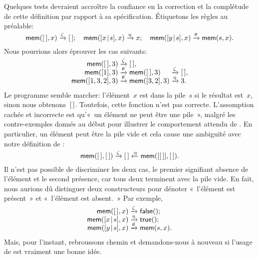 Quelques tests devraient accroître la confiance en la
correction et la complétude de
cette définition par rapport à sa spécification. Étiquetons les règles
au préalable:
\begin{equation*}
\textsf{mem}([\,],x)         \xrightarrow{\smash{\zeta}} [\,];\quad
\textsf{mem}([{x}\!\mid\!{s}],x) \xrightarrow{\smash{\eta}}   x;\quad
\textsf{mem}([{y}\!\mid\!{s}],x) \xrightarrow{\smash{\theta}} \textsf{mem}(s,x).
\end{equation*}
Nous pourrions alors éprouver les cas suivants:
\begin{equation*}
\begin{array}{r@{\;}l@{\;}l@{\;}l@{\;}l}
\fun{mem}(\el,3) & \smashedrightarrow{\zeta} & \el,\\
\fun{mem}([1],3) & \smashedrightarrow{\theta} & \fun{mem}(\el,3)
& \smashedrightarrow{\zeta} & \el,\\
\fun{mem}([1,3,2],3) & \smashedrightarrow{\theta} & \fun{mem}([3,2],3)
& \smashedrightarrow{\eta} & 3.
\end{array}
\end{equation*}
Le programme semble marcher: l'élément~\(x\) est dans la pile~\(s\) si
le résultat est~\(x\), sinon nous obtenons~\([\,]\). Toutefois, cette
fonction n'est pas correcte. L'assomption cachée et
incorrecte est qu'«~un élément ne peut être une pile~», malgré les
contre-exemples donnés au début pour illustrer le comportement attendu
de . En particulier, un élément peut être la pile vide et
cela cause une ambiguïté avec notre définition de :
\begin{equation*}
  \textsf{mem}([\,],[\,]) \xrightarrow{\smash{\zeta}} [\,] \xleftarrow{\smash{\eta}} \textsf{mem}([[\,]],[\,]).
\end{equation*}
Il n'est pas possible de discriminer les deux cas, le premier
signifiant absence de l'élément et le second présence, car tous deux
terminent avec la pile vide. En fait, nous aurions dû distinguer deux
constructeurs pour dénoter «~l'élément est présent~» et «~l'élément est
absent.~» Par exemple,
\begin{equation*}
\begin{array}{r@{\;}l@{\;}l}
\fun{mem}(\el,x)         & \smashedrightarrow{\zeta}  & \fun{false}();\\
\fun{mem}(\cons{x}{s},x) & \smashedrightarrow{\eta}   & \fun{true}();\\
\fun{mem}(\cons{y}{s},x) & \smashedrightarrow{\theta} & \fun{mem}(s,x).
\end{array}
\end{equation*}
Mais, pour l'instant, rebroussons chemin et demandons-nous à nouveau
si l'usage de  est vraiment une bonne idée.

